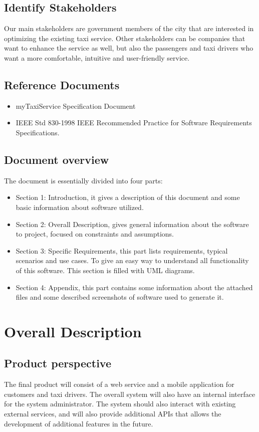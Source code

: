 \documentclass[a4paper,12pt]{article}%
\begin{document}
\subsection{Identify Stakeholders}
Our main stakeholders are government members of the city that are interested in optimizing the existing taxi service.
Other stakeholders can be companies that want to enhance the service as well, but also the passengers and taxi drivers who want a more comfortable, intuitive and user-friendly service.
\subsection{Reference Documents}
\begin{itemize}
\item myTaxiService Specification Document
\item IEEE Std 830-1998 IEEE Recommended Practice for Software 
Requirements Specifications.
\end{itemize}
\subsection{Document overview}
The document is essentially divided into four parts:
\begin{itemize}
\item Section 1: Introduction, it gives a description of this document and some basic information about software utilized.
\item Section 2: Overall Description, gives general information about the software to project, focused on constraints and assumptions.
\item Section 3: Specific Requirements, this part lists requirements, typical scenarios and use cases. To give an easy way to understand all functionality
of this software. This section is filled with UML diagrams.
\item  Section 4: Appendix, this part contains some information about the attached files and some described screenshots of software used to generate
it.
\end{itemize}
\newpage
\section{Overall Description}
\subsection{Product perspective}
The final product will consist of a web service and a mobile application for customers and taxi drivers.
The overall system will also have an internal interface for the system administrator. The system should also interact with existing external services, and will also provide additional APIs that allows the development of additional features in the future. 
\end{document}
